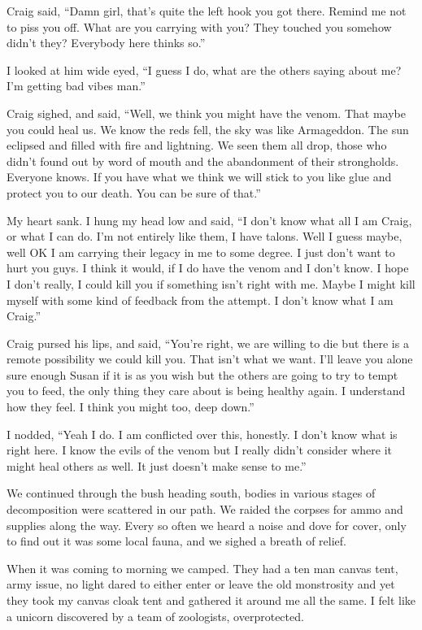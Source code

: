 Craig said, ``Damn girl, that's quite the left hook you got there. Remind me not to piss you off. What are you carrying with you? They touched you somehow didn't they? Everybody here thinks so.''

I looked at him wide eyed, ``I guess I do, what are the others saying about me? I'm getting bad vibes man.''

Craig sighed, and said, ``Well, we think you might have the venom. That maybe you could heal us. We know the reds fell, the sky was like Armageddon. The sun eclipsed and filled with fire and lightning. We seen them all drop, those who didn't found out by word of mouth and the abandonment of their strongholds. Everyone knows. If you have what we think we will stick to you like glue and protect you to our death. You can be sure of that.''

My heart sank. I hung my head low and said, ``I don't know what all I am Craig, or what I can do. I'm not entirely like them, I have talons. Well I guess maybe, well OK I am carrying their legacy in me to some degree. I just don't want to hurt you guys. I think it would, if I do have the venom and I don't know. I hope I don't really, I could kill you if something isn't right with me. Maybe I might kill myself with some kind of feedback from the attempt. I don't know what I am Craig.''

Craig pursed his lips, and said, ``You're right, we are willing to die but there is a remote possibility we could kill you. That isn't what we want. I'll leave you alone sure enough Susan if it is as you wish but the others are going to try to tempt you to feed, the only thing they care about is being healthy again. I understand how they feel. I think you might too, deep down.''

I nodded, ``Yeah I do. I am conflicted over this, honestly. I don't know what is right here. I know the evils of the venom but I really didn't consider where it might heal others as well. It just doesn't make sense to me.''

We continued through the bush heading south, bodies in various stages of decomposition were scattered in our path. We raided the corpses for ammo and supplies along the way. Every so often we heard a noise and dove for cover, only to find out it was some local fauna, and we sighed a breath of relief.

When it was coming to morning we camped. They had a ten man canvas tent, army issue, no light dared to either enter or leave the old monstrosity and yet they took my canvas cloak tent and gathered it around me all the same. I felt like a unicorn discovered by a team of zoologists, overprotected.

